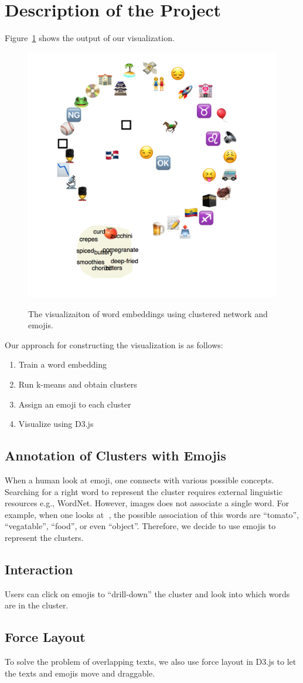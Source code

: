 \section{Description of the Project}
Figure~\ref{fig:cluster_network} shows the output of our visualization. 

\begin{figure}[htb]
 \centering
     {\includegraphics[width=0.58\linewidth]{clustered_network.png}}
    \vspace{-1ex}
     \caption{The visualizaiton of word embeddings using clustered network and emojis.}
\label{fig:cluster_network}
\end{figure}


Our approach for constructing the visualization is as follows:
\begin{enumerate}
 \item Train a word embedding
 \item Run k-means and obtain clusters
 \item Assign an emoji to each cluster
 \item Visualize using D3.js
\end{enumerate}

\subsection{Annotation of Clusters with Emojis}
When a human look at emoji, one connects with various possible concepts. 
Searching for a right word to represent the cluster requires external linguistic resources e.g., WordNet. 
However, images does not associate a single word. 
For example, when one looks at 🍅, the possible association of this words are ``tomato'', ``vegatable'', ``food'', or even ``object''. 
Therefore, we decide to use emojis to represent the clusters. 


\subsection{Interaction}
Users can click on emojis to ``drill-down'' \cite{Elmqvist:2010:HAI:1749404.1749525} the cluster and look into which words are in the cluster.


\subsection{Force Layout}
To solve the problem of overlapping texts, we also use force layout in D3.js to let the texts and emojis move and draggable. 
